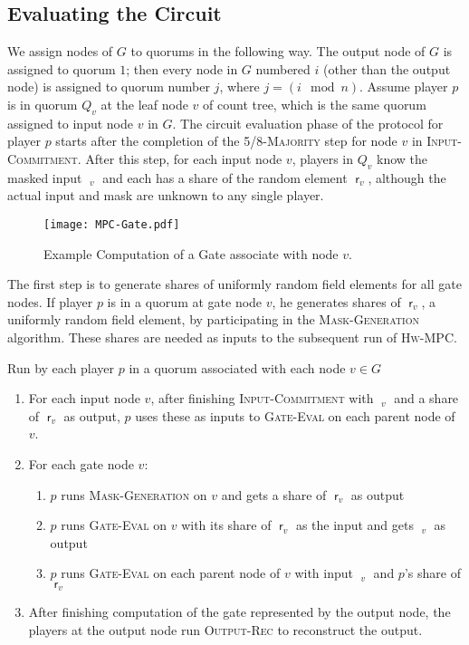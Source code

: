 \documentclass[10pt]{llncs}
\newcommand{\thresh}{5/8\xspace}
\newcommand{\hw}{\textsc{Hw-MPC}\xspace}
\newcommand{\ic}{\textsc{Input-Commitment}\xspace}
\newcommand{\ce}{\textsc{Circuit-Eval}\xspace}
\newcommand{\gm}{\textsc{Mask-Generation}\xspace}
\newcommand{\gcomp}{\textsc{Gate-Eval}\xspace}
\newcommand{\outrec}{\textsc{Output-Rec}\xspace}
\newcommand{\maj}{\thresh-\textsc{Majority}\xspace}
\newcommand{\ct}{count tree\xspace}
\DeclareMathOperator{\mask}{\mathsf{r}}
\DeclareMathOperator{\mv}{\mathsf{\hat{y}}}
\begin{document}
\subsection{Evaluating the Circuit} \label{sec:compute}


We assign nodes of $G$ to quorums in the following way. The output
node of $G$ is assigned to quorum $1$; then every node in $G$ numbered
$i$ (other than the output node) is assigned to quorum number $j$,
where $j = (i \mod n)$.  
Assume player $p$ is in quorum $Q_v$
at the leaf node $v$ of \ct, which is the same quorum assigned to
input node $v$ in $G$. The circuit evaluation phase of the protocol
for player $p$ starts after the completion of the \maj step for node
$v$ in \ic. After this step, for each input node $v$, players in $Q_v$
know the masked input $\mv_v$ and each has a share of the random
element $\mask_v$, although the actual input and mask are unknown to
any single player.
\begin{figure}[t]
  \begin{center}
  \texttt{[image: MPC-Gate.pdf]}
  \end{center}
  \caption{Example Computation of a Gate associate with node $v$.}
  \label{f:quorums}
  \end{figure} 
The first step is to generate shares of uniformly random field
elements for all gate nodes. If player $p$ is in a quorum at gate node
$v$, he generates shares of $\mask_v$, a uniformly random field
element, by participating in the \gm algorithm. These shares are
needed as inputs to the subsequent run of \hw.


\begin{algorithm}
\caption{\ce}\label{alg:ce}
Run by each player $p$ in a quorum associated with each node $v \in G$
\begin{enumerate}
\item For each input node $v$, after finishing \ic with $\mv_v$ and a share of $\mask_v$ as output, $p$ uses these as inputs to \gcomp on each parent node of $v$.\item For each gate node $v$:
\begin{enumerate}
\item $p$ runs \gm on $v$ and gets a share of $\mask_v$ as output
\item $p$ runs \gcomp on $v$ with its share of $\mask_v$ as the input and gets $\mv_v$ as output
\item $p$ runs \gcomp on each parent node of $v$ with input $\mv_v$ and $p$'s share of $\mask_v$
\end{enumerate}
\item After finishing computation of the gate represented by the output node, the players at the output node run \outrec to reconstruct the output.
\end{enumerate}
\end{algorithm}
\end{document}
